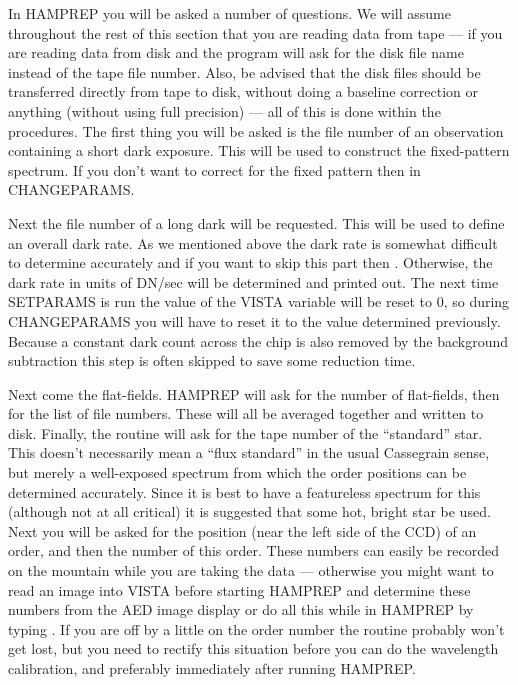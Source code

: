 In {\tenit HAMPREP} you will be asked a number of questions.  We will assume
throughout the rest of this section that you are reading data from tape --- if
you are reading data from disk  and the program will ask for
the disk file name instead of the tape file number.  Also, be advised that the
disk files should be transferred directly from tape to disk, without doing a
baseline correction or anything (without using full precision) --- all of this
is done within the procedures.  The first thing you will be asked is the file
number of an observation containing a short dark exposure. This will be used
to construct the fixed-pattern spectrum. If you don't want to correct for the
fixed pattern then  in {\tenit CHANGEPARAMS}.

Next the file number of a long dark will be requested.  This will be used to
define an overall dark rate.  As we mentioned above the dark rate is somewhat
difficult to determine accurately and if you want to skip this part then
. Otherwise, the dark rate in units of DN/sec will be
determined and printed out. The next time {\tenit SETPARAMS} is run the value
of the VISTA variable  will be reset to 0, so during {\tenit
CHANGEPARAMS} you will have to reset it to the value determined previously.
Because a constant dark count across the chip is also removed by the
background subtraction this step is often skipped to save some reduction time.

Next come the flat-fields.  {\tenit HAMPREP} will ask for the number of
flat-fields, then for the list of file numbers.  These will all be averaged
together and written to disk.  Finally, the routine will ask for the tape
number of the ``standard'' star.  This doesn't necessarily mean a ``flux
standard'' in the usual Cassegrain sense, but merely a well-exposed spectrum
from which the order positions can be determined accurately. Since it is best
to have a featureless spectrum for this (although not at all critical) it is
suggested that some hot, bright star be used. Next you will be asked for the
position (near the left side of the CCD) of an order, and then the number of
this order.  These numbers can easily be recorded on the mountain while you
are taking the data --- otherwise you might want to read an image into VISTA
before starting {\tenit HAMPREP} and determine these numbers from the AED
image display or do all this while in {\tenit HAMPREP}  by typing .
 If you are off by a little on the order number the routine probably won't get
lost, but you need to rectify this situation before you can do the wavelength
calibration, and preferably immediately after running {\tenit HAMPREP}.

